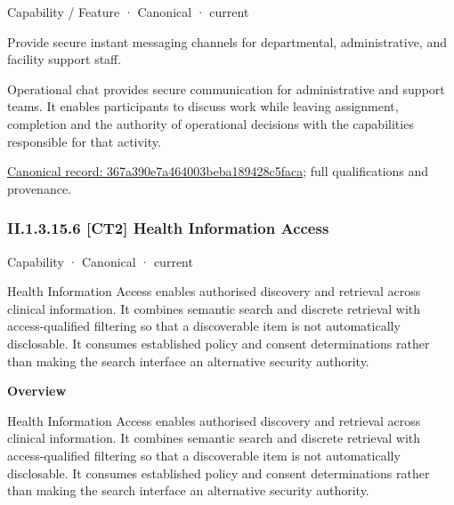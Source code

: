 \label{element:367a390e7a464003beba189428c5faca}
{\small Capability / Feature · Canonical · current}\par

Provide secure instant messaging channels for departmental, administrative, and facility support staff.



Operational chat provides secure communication for administrative and support teams. It enables participants to discuss work while leaving assignment, completion and the authority of operational decisions with the capabilities responsible for that activity.


{\footnotesize \href{../../../../continuum/strategy/capability/feature/367a390e7a464003beba189428c5faca.md}{Canonical record: 367a390e7a464003beba189428c5faca}; full qualifications and provenance.}\par
\subsubsection*{II.1.3.15.6 [CT2] Health Information Access}
\label{navigation:II.1.3.15.6}

\label{element:cc253aea3c5f489da0502df74dde1669}
{\small Capability · Canonical · current}\par

Health Information Access enables authorised discovery and retrieval across clinical information. It combines semantic search and discrete retrieval with access-qualified filtering so that a discoverable item is not automatically disclosable. It consumes established policy and consent determinations rather than making the search interface an alternative security authority.



\textbf{Overview}



Health Information Access enables authorised discovery and retrieval across clinical information. It combines semantic search and discrete retrieval with access-qualified filtering so that a discoverable item is not automatically disclosable. It consumes established policy and consent determinations rather than making the search interface an alternative security authority.



